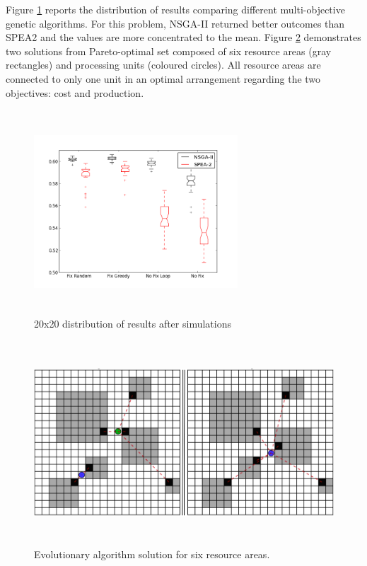 \documentclass{llncs}
\begin{document}
\FloatBarrier

Figure  \ref{fig:box1} reports the distribution of results comparing different multi-objective genetic algorithms. For this problem, NSGA-II returned better outcomes than SPEA2 and the values are more concentrated to the mean. Figure  \ref{fig:map1} demonstrates two solutions from Pareto-optimal set composed of six resource areas (gray rectangles) and processing units (coloured circles). All resource areas are connected to only one unit in an optimal arrangement regarding the two objectives: cost and production. 


 
\begin{figure}
\centering
\includegraphics[height=3in,width=3in]{box2.png}
\caption{20x20 distribution of results after simulations}
\label{fig:box1}
\end{figure}
\FloatBarrier


\begin{figure}
\centering
\includegraphics[height=3in,width=5in]{mapsolution1.png}
\caption{Evolutionary algorithm solution for six resource areas.}
\label{fig:map1}
\end{figure}
\FloatBarrier
\end{document}
